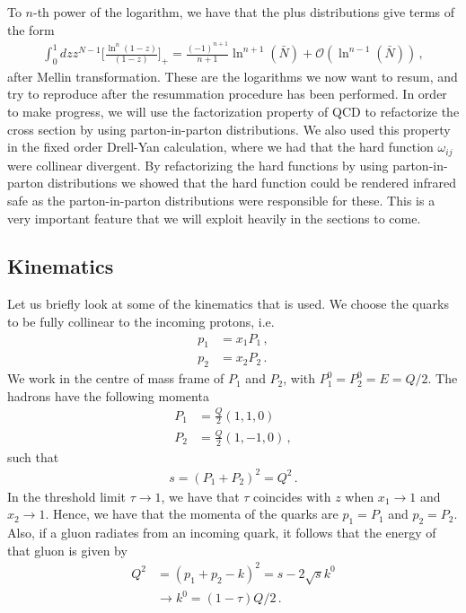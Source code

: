 To $n$-th power of the logarithm, we have that the plus distributions give terms of the form
\begin{align}
    \int_{0}^{1}dz z^{N-1}\Big[\frac{\ln^{n}(1-z)}{(1-z)}\Big]_{+}=\frac{(-1)^{n+1}}{n+1}\ln^{n+1}(\bar{N})+\mathcal{O}(\ln^{n-1}(\bar{N}))\,,
\end{align}
after Mellin transformation. These are the logarithms we now want to resum, and try to reproduce after the resummation procedure has been performed. In order to make progress, we will use the factorization property of QCD to refactorize the cross section by using parton-in-parton distributions. We also used this property in the fixed order Drell-Yan calculation, where we had that the hard function $\omega_{ij}$ were collinear divergent. By refactorizing the hard functions by using parton-in-parton distributions we showed that the hard function could be rendered infrared safe as the parton-in-parton distributions were responsible for these. This is a very important feature that we will exploit heavily in the sections to come. 

\subsection*{Kinematics}
Let us briefly look at some of the kinematics that is used. We choose the quarks to be fully collinear to the incoming protons, i.e.
\begin{align}
    p_{1}&=x_{1}P_1\,,
    \\
    p_{2}&=x_{2}P_2\,.
\end{align}
We work in the centre of mass frame of $P_1$ and $P_2$, with $P_{1}^{0}=P_{2}^{0}=E=Q/2$. The hadrons have the following momenta
\begin{align}
    P_{1}&=\frac{Q}{2}(1,1,0)
    \\
    P_{2}&=\frac{Q}{2}(1,-1,0)\,,
\end{align}
such that
\begin{align}
    s=(P_1+P_2)^{2}=Q^{2}\,.
\end{align}
In the threshold limit $\tau\rightarrow 1$, we have that $\tau$ coincides with $z$ when $x_{1}\rightarrow 1$ and $x_{2}\rightarrow 1$. Hence, we have that the momenta of the quarks are $p_1=P_1$ and $p_2=P_2$. Also, if a gluon radiates from an incoming quark, it follows that the energy of that gluon is given by
\begin{align}
    Q^{2}&=(p_1+p_2-k)^{2}=s-2\sqrt{s}k^{0}
    \\
    &\rightarrow k^{0}=(1-\tau)Q/2\,.
\end{align}


